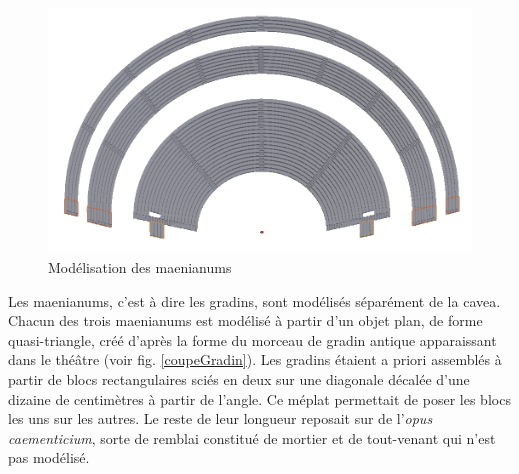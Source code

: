\begin{figure}[!h]
	\includegraphics[width=\linewidth]{images/modMaenianum}
	\caption{Modélisation des \glspl{maenianum}} 
	\label{modMaenianum} 
\end{figure} 

Les \glspl{maenianum}, c'est à dire les gradins, sont modélisés séparément de la \gls{cavea}. Chacun des trois \glspl{maenianum} est modélisé à partir d'un objet plan, de forme quasi-triangle, créé d'après la forme du morceau de gradin antique apparaissant dans le théâtre (voir fig. \ref{coupeGradin}). Les gradins étaient a priori assemblés à partir de blocs rectangulaires sciés en deux sur une diagonale décalée d'une dizaine de centimètres à partir de l'angle. Ce méplat permettait de poser les blocs les uns sur les autres. Le reste de leur longueur reposait sur de l'\textit{opus caementicium}, sorte de remblai constitué de mortier et de tout-venant qui n'est pas modélisé. 

